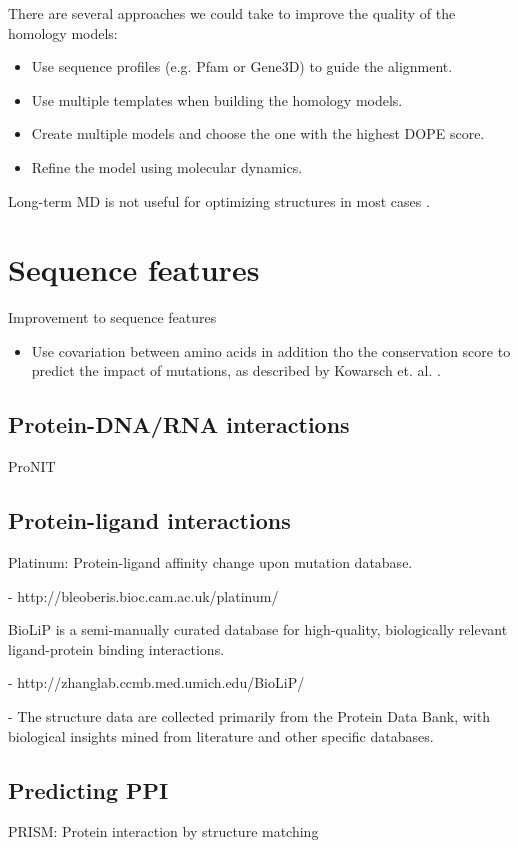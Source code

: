 There are several approaches we could take to improve the quality of the homology models:

\begin{itemize}
\item Use sequence profiles (e.g. Pfam or Gene3D) to guide the alignment.  
\item Use multiple templates when building the homology models.
\item Create multiple models and choose the one with the highest DOPE score.
\item Refine the model using molecular dynamics.
\end{itemize}

Long-term MD is not useful for optimizing structures in most cases \cite{raval_refinement_2012}.



\section{Sequence features}

Improvement to sequence features

\begin{itemize}
\item Use covariation between amino acids in addition tho the conservation score to predict the impact of mutations, as described by Kowarsch et. al. \cite{kowarsch_correlated_2010}.
\end{itemize}



\subsection{Protein-DNA/RNA interactions}

ProNIT



\subsection{Protein-ligand interactions}

Platinum: Protein-ligand affinity change upon mutation database.

  - http://bleoberis.bioc.cam.ac.uk/platinum/


BioLiP is a semi-manually curated database for high-quality, biologically relevant ligand-protein binding interactions. 

  - http://zhanglab.ccmb.med.umich.edu/BioLiP/

  - The structure data are collected primarily from the Protein Data Bank, with biological insights mined from literature and other specific databases.

\subsection{Predicting PPI}

PRISM: Protein interaction by structure matching
